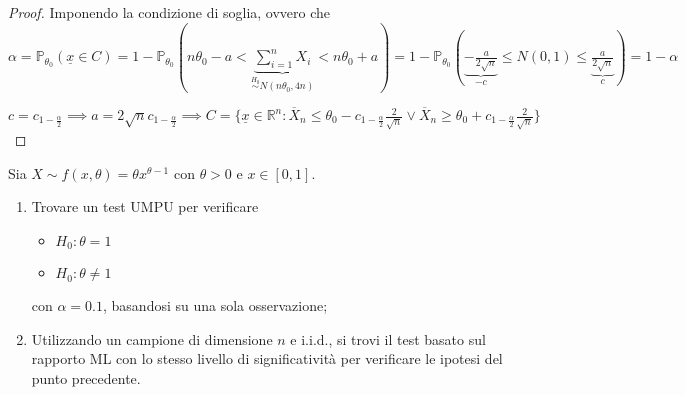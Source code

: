 \documentclass[hidelinks, 10pt]{report}
\begin{document}
\begin{proof}
Imponendo la condizione di soglia, ovvero che $ \alpha = \mathbb{P}_{\theta_{0}} (\underline{x} \in C) = 1 - \mathbb{P}_{\theta_{0}} (n \theta_{0} - a < \underbrace{\sum\limits_{i = 1}^{n} X_{i}}_{\stackrel{H_{0}}{\sim} N(n \theta_{0}, 4n)} < n \theta_{0} + a) = 1 - \mathbb{P}_{\theta_{0}} \left( \underbrace{-\frac{a}{2 \sqrt{n}}}_{-c} \le N(0,1) \le \underbrace{\frac{a}{2 \sqrt{n}}}_{c} \right) = 1 - \alpha $

$ c = c_{1 - \frac{\alpha}{2}} \implies a = 2 \sqrt{n} c_{1 - \frac{\alpha}{2}} \implies C = \{ \underline{x} \in \mathbb{R}^{n} : \overline{X}_{n} \le \theta_{0} - c_{1 - \frac{\alpha}{2}} \frac{2}{\sqrt{n}} \lor \overline{X}_{n} \ge \theta_{0} + c_{1 - \frac{\alpha}{2}} \frac{2}{\sqrt{n}} \} $
\end{proof}

\begin{ex}
Sia $ X \sim f(x, \theta) = \theta x^{\theta - 1} $ con $ \theta > 0 $ e $ x \in [0, 1] $.
\begin{enumerate}
\item Trovare un test UMPU per verificare
\begin{itemize}
\item $ H_{0}: \theta = 1 $
\item $ H_{0}: \theta \ne 1 $
\end{itemize}
con $ \alpha = 0.1 $, basandosi su una sola osservazione;
\item Utilizzando un campione di dimensione $ n $ e i.i.d., si trovi il test basato sul rapporto ML con lo stesso livello di significativit\`a per verificare le ipotesi del punto precedente.
\end{enumerate}
\end{ex}
\end{document}
